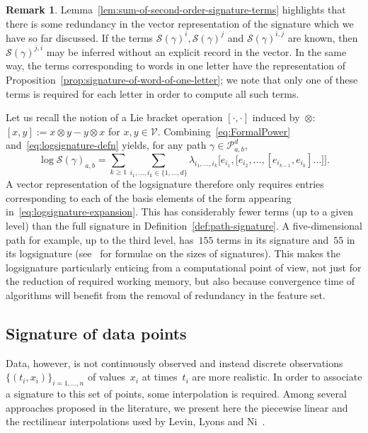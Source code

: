 \documentclass{amsart}[11pt]
\numberwithin{equation}{section}
\theoremstyle{definition}
\newtheorem{remark}[theorem]{Remark}
\newcommand{\Pp}{\mathcal{P}}
\newcommand{\Vv}{\mathcal{V}}
\newcommand{\Ss}{\mathcal{S}}
\newcommand{\Pab}{\Pp_{a,b}^{d}}
\newcommand{\tens} {\mathbin{\mathop{\otimes}}}
\begin{document}
\begin{remark}
Lemma~\ref{lem:sum-of-second-order-signature-terms} highlights that there is some redundancy in the vector representation of the signature which we have so far discussed.
If the terms $\Ss(\gamma)^i, \Ss(\gamma)^j$ and $\Ss(\gamma)^{i, j}$ are known, then $\Ss(\gamma)^{j, i}$ may be inferred without an explicit record in the vector.
In the same way, the terms corresponding to words in one letter have the representation of Proposition~\ref{prop:signature-of-word-of-one-letter}; we note that only one of these terms is required for each letter in order to compute all such terms.
\end{remark}

Let us recall the notion of a Lie bracket operation $[\cdot, \cdot]$ induced by~$\tens$:
$[x,y] := x \tens y - y \tens x$ for $x, y \in \Vv$.
Combining~\eqref{eq:FormalPower} and~\eqref{eq:logsignature-defn} yields, for any path $\gamma\in\Pab$,
    \begin{equation}
        \label{eq:logsignature-expansion}
        \log \Ss(\gamma)_{a,b} = \sum_{k \geq 1} \sum_{i_1, \ldots, i_k \in \{1, \ldots, d\}} 
\lambda_{i_1, \ldots, i_k} \Big[e_{i_1}, \big[e_{i_2}, \ldots, [e_{i_{k-1}}, e_{i_k}] \ldots\big]\Big].
    \end{equation}
A vector representation of the logsignature therefore only requires entries corresponding to each of the basis elements of the form appearing in~\eqref{eq:logsignature-expansion}. 
This has considerably fewer terms (up to a given level) than the full signature in Definition~\ref{def:path-signature}. 
A five-dimensional path for example, up to the third level, has~$155$ terms in its signature and~$55$ in its logsignature (see~\cite{Reizenstein17} for formulae on the sizes of signatures). 
This makes the logsignature particularly enticing from a computational point of view, 
not just for the reduction of  required working memory, 
but also because convergence time of algorithms will benefit from the removal of redundancy in the feature set.


\subsection{Signature of data points}\label{sec:signature-of-data-points}
Data, however, is not continuously observed and instead discrete observations $\{(t_i, x_i)\}_{i=1,\ldots, n}$ of values~$x_i$ at times~$t_i$ are more realistic.
In order to associate a signature to this set of points, some interpolation is required.
Among several approaches proposed in the literature, we present here the piecewise linear and the rectilinear interpolations used by Levin, Lyons and Ni~\cite{Levin13}.
\end{document}
